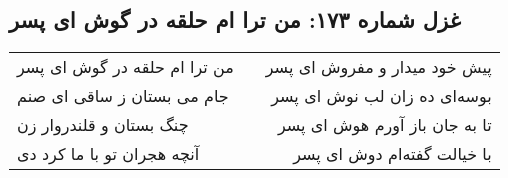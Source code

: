 \begin{center}
\section*{غزل شماره ۱۷۳: من ترا ام حلقه در گوش ای پسر}
\label{sec:173}
\begin{longtable}{l p{0.5cm} r}
من ترا ام حلقه در گوش ای پسر
&&
پیش خود میدار و مفروش ای پسر
\\
جام می بستان ز ساقی ای صنم
&&
بوسه‌ای ده زان لب نوش ای پسر
\\
چنگ بستان و قلندروار زن
&&
تا به جان باز آورم هوش ای پسر
\\
آنچه هجران تو با ما کرد دی
&&
با خیالت گفته‌ام دوش ای پسر
\\
\end{longtable}
\end{center}
